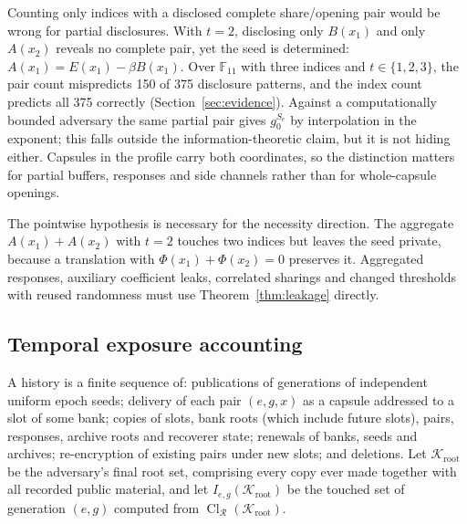 \documentclass[pdflatex,sn-mathphys-num]{sn-jnl}%
\theoremstyle{plain}
\theoremstyle{definition}
\newcommand{\Cl}{\operatorname{Cl}}
\newcommand{\F}{\mathbb{F}}
\begin{document}
Counting only indices with a disclosed complete share/opening pair would be wrong for partial disclosures. With $t=2$, disclosing only $B(x_1)$ and only $A(x_2)$ reveals no complete pair, yet the seed is determined: $A(x_1)=E(x_1)-\beta B(x_1)$. Over $\F_{11}$ with three indices and $t\in\{1,2,3\}$, the pair count mispredicts 150 of 375 disclosure patterns, and the index count predicts all 375 correctly (Section~\ref{sec:evidence}). Against a computationally bounded adversary the same partial pair gives $g_0^{S_e}$ by interpolation in the exponent; this falls outside the information-theoretic claim, but it is not hiding either. Capsules in the profile carry both coordinates, so the distinction matters for partial buffers, responses and side channels rather than for whole-capsule openings.

The pointwise hypothesis is necessary for the necessity direction. The aggregate $A(x_1)+A(x_2)$ with $t=2$ touches two indices but leaves the seed private, because a translation with $\Phi(x_1)+\Phi(x_2)=0$ preserves it. Aggregated responses, auxiliary coefficient leaks, correlated sharings and changed thresholds with reused randomness must use Theorem~\ref{thm:leakage} directly.

\subsection{Temporal exposure accounting}
A history is a finite sequence of: publications of generations of independent uniform epoch seeds; delivery of each pair $(e,g,x)$ as a capsule addressed to a slot of some bank; copies of slots, bank roots (which include future slots), pairs, responses, archive roots and recoverer state; renewals of banks, seeds and archives; re-encryption of existing pairs under new slots; and deletions. Let $\mathcal K_{\mathrm{root}}$ be the adversary's final root set, comprising every copy ever made together with all recorded public material, and let $I_{e,g}(\mathcal K_{\mathrm{root}})$ be the touched set of generation $(e,g)$ computed from $\Cl_{\mathcal R}(\mathcal K_{\mathrm{root}})$.
\end{document}
